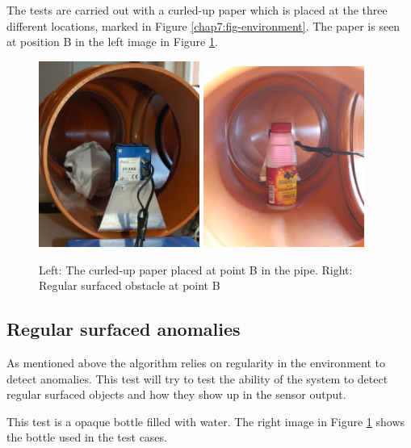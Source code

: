 The tests are carried out with a curled-up paper which is placed at the three different
locations, marked in Figure \ref{chap7:fig-environment}. The paper is seen at position B
in the left image in Figure \ref{chap7:fig-pics-of-obstacles}.
\begin{figure}[htbp]
    \centering
    \includegraphics[width=0.47\textwidth]{pics/irregularSR}
    \includegraphics[width=0.47\textwidth]{pics/pos2-regular-tof}
    \caption{Left: The curled-up paper placed at point B in the pipe. Right: Regular
    surfaced obstacle at point B}
    \label{chap7:fig-pics-of-obstacles}
\end{figure}

\subsection{Regular surfaced anomalies}
As mentioned above the algorithm relies on regularity in the environment to detect
anomalies. This test will try to test the ability of the system to detect regular surfaced
objects and how they show up in the sensor output.

This test is a opaque bottle filled with water. The right image in Figure
\ref{chap7:fig-pics-of-obstacles} shows the bottle used in the test cases.

